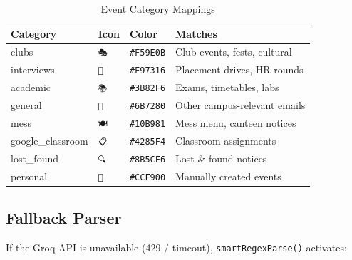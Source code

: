 \documentclass[12pt,a4paper]{report}
\newcommand{\code}[1]{\texttt{\small\color{type}#1}}
\begin{document}
\begin{table}[H]
\centering
{}
\begin{tabularx}{\textwidth}{l l l X}
\rowcolor{tableheadbg}
\color{white}Category & \color{white}Icon & \color{white}Color & \color{white}Matches \\
\toprule
clubs          & \texttt{🎭} & \texttt{\#F59E0B} & Club events, fests, cultural \\
interviews     & \texttt{💼} & \texttt{\#F97316} & Placement drives, HR rounds  \\
academic       & \texttt{📚} & \texttt{\#3B82F6} & Exams, timetables, labs      \\
general        & \texttt{📢} & \texttt{\#6B7280} & Other campus-relevant emails \\
mess           & \texttt{🍽}  & \texttt{\#10B981} & Mess menu, canteen notices   \\
google\_classroom & \texttt{📋} & \texttt{\#4285F4} & Classroom assignments        \\
lost\_found    & \texttt{🔍} & \texttt{\#8B5CF6} & Lost \& found notices        \\
personal       & \texttt{👤} & \texttt{\#CCF900} & Manually created events      \\
\bottomrule
\end{tabularx}
\caption{Event Category Mappings}
\end{table}

\subsection{Fallback Parser}

If the Groq API is unavailable (429 / timeout), \code{smartRegexParse()} activates:
\end{document}
